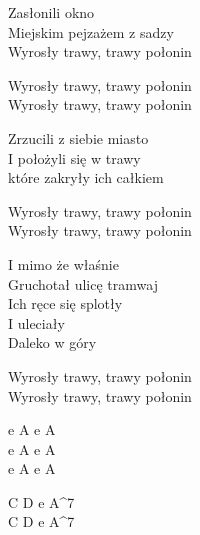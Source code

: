 \begin{text}
    Zasłonili okno\\
    Miejskim pejzażem z sadzy\\
    Wyrosły trawy, trawy połonin

    \vin Wyrosły trawy, trawy połonin\\
    \vin Wyrosły trawy, trawy połonin

    Zrzucili z siebie miasto\\
    I położyli się w trawy\\
    które zakryły ich całkiem

    \vin Wyrosły trawy, trawy połonin\\
    \vin Wyrosły trawy, trawy połonin

    I mimo że właśnie\\
    Gruchotał ulicę tramwaj\\
    Ich ręce się splotły\\
    I uleciały\\
    Daleko w góry

    \vin Wyrosły trawy, trawy połonin\\
    \vin Wyrosły trawy, trawy połonin
\end{text}
\begin{chord}
    e A e A\\
    e A e A\\
    e A e A

    C D e A^7\\
	C D e A^7
\end{chord}